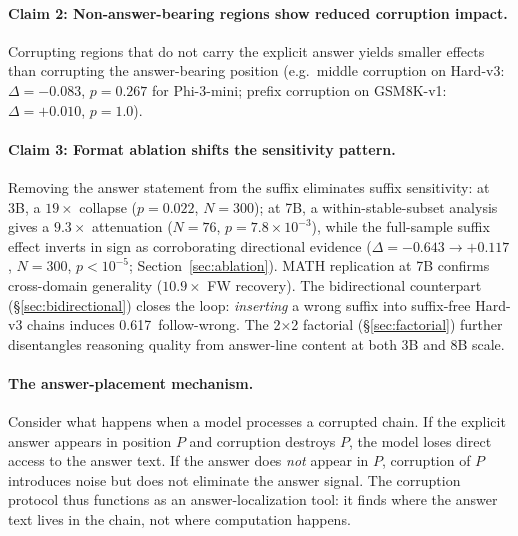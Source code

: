 \documentclass{article}
\theoremstyle{definition}
\theoremstyle{definition}
\newcommand{\BIDCCFW}{0.617}
\begin{document}
\paragraph{Claim 2: Non-answer-bearing regions show reduced corruption impact.}
Corrupting regions that do not carry the explicit answer
yields smaller effects than corrupting the answer-bearing position
(e.g.\ middle corruption on Hard-v3: $\Delta=-0.083$, $p=0.267$ for Phi-3-mini;
prefix corruption on GSM8K-v1: $\Delta = +0.010$, $p=1.0$).

\paragraph{Claim 3: Format ablation shifts the sensitivity pattern.}
Removing the answer statement from the suffix eliminates suffix
sensitivity: at 3B, a $19\times$ collapse ($p{=}0.022$, $N{=}300$); at
7B, a within-stable-subset analysis gives a $9.3\times$ attenuation
($N{=}76$, $p{=}7.8\times10^{-3}$), while the full-sample suffix effect
inverts in sign as corroborating directional evidence
($\Delta{=}{-}0.643 \to {+}0.117$, $N{=}300$, $p{<}10^{-5}$; Section~\ref{sec:ablation}).
MATH replication at 7B confirms
cross-domain generality ($10.9\times$ FW recovery).
The bidirectional counterpart (\S\ref{sec:bidirectional}) closes the loop:
\emph{inserting} a wrong suffix into suffix-free Hard-v3 chains
induces \BIDCCFW\ follow-wrong.
The 2$\times$2 factorial (\S\ref{sec:factorial}) further disentangles
reasoning quality from answer-line content at both 3B and 8B scale.

\paragraph{The answer-placement mechanism.}
Consider what happens when a model processes a corrupted chain. If the
explicit answer appears in position $P$ and corruption destroys $P$, the
model loses direct access to the answer text. If the answer does
\emph{not} appear in $P$, corruption of $P$ introduces noise but does
not eliminate the answer signal. The corruption protocol thus functions
as an answer-localization tool: it finds where the answer text lives
in the chain, not where computation happens.
\end{document}
